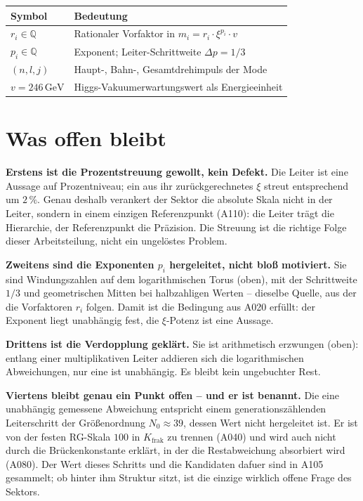 \begin{center}
\renewcommand{\arraystretch}{1.3}
{\small\begin{tabular}{lp{9cm}}
\toprule
Symbol & Bedeutung \\
\midrule
$r_i\in\mathbb{Q}$ & Rationaler Vorfaktor in $m_i=r_i\cdot\xi^{p_i}\cdot v$ \\
$p_i\in\mathbb{Q}$ & Exponent; Leiter-Schrittweite $\Delta p=1/3$ \\
$(n,l,j)$ & Haupt-, Bahn-, Gesamtdrehimpuls der Mode \\
$v=246\,\text{GeV}$ & Higgs-Vakuumerwartungswert als Energieeinheit \\
\bottomrule
\end{tabular}}
\renewcommand{\arraystretch}{1.0}
\end{center}

\section{Was offen bleibt}

\textbf{Erstens ist die Prozentstreuung gewollt, kein Defekt.} Die Leiter ist
eine Aussage auf Prozentniveau; ein aus ihr zurückgerechnetes $\xi$ streut
entsprechend um $2\,\%$. Genau deshalb verankert der Sektor die absolute Skala
nicht in der Leiter, sondern in einem einzigen Referenzpunkt (A110): die Leiter
trägt die Hierarchie, der Referenzpunkt die Präzision. Die Streuung ist die
richtige Folge dieser Arbeitsteilung, nicht ein ungelöstes Problem.

\textbf{Zweitens sind die Exponenten $p_i$ hergeleitet, nicht bloß motiviert.}
Sie sind Windungszahlen auf dem logarithmischen Torus (oben), mit der
Schrittweite $1/3$ und geometrischen Mitten bei halbzahligen Werten -- dieselbe
Quelle, aus der die Vorfaktoren $r_i$ folgen. Damit ist die Bedingung aus A020
erfüllt: der Exponent liegt unabhängig fest, die $\xi$-Potenz ist eine Aussage.

\textbf{Drittens ist die Verdopplung geklärt.} Sie ist arithmetisch erzwungen
(oben): entlang einer multiplikativen Leiter addieren sich die logarithmischen
Abweichungen, nur eine ist unabhängig. Es bleibt kein ungebuchter Rest.

\textbf{Viertens bleibt genau ein Punkt offen -- und er ist benannt.} Die eine
unabhängig gemessene Abweichung entspricht einem generationszählenden
Leiterschritt der Größenordnung $N_0 \approx 39$, dessen Wert nicht hergeleitet
ist. Er ist von der festen RG-Skala $100$ in $K_\text{frak}$ zu trennen (A040)
und wird auch nicht durch die Brückenkonstante erklärt, in der die Restabweichung
absorbiert wird (A080). Der Wert dieses Schritts und die Kandidaten dafuer sind in A105 gesammelt; ob hinter ihm Struktur sitzt, ist die einzige wirklich offene Frage des Sektors.

